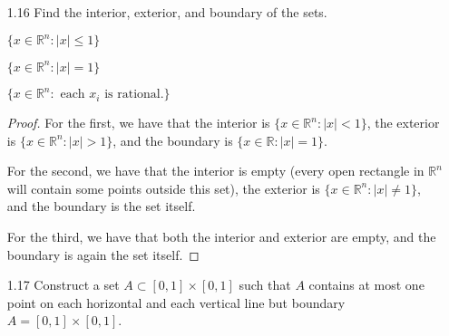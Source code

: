 \begin{enumerate}
    \begin{proof}
    Let \( x \in B_a(r) \). Then, from the Corollary, we get that there exists an open rectangle, \( U \), such that
    \[
    U \subset B_x\left( r-\left| x-a \right|\right) \subset B_a(r)
    \]
    Therefore, \( B_a(r) \) is open.
    \end{proof}
    
    It is not to hard to apply the same idea backwards: every open rectangle contains an open ball. Thus a set, \( A \), is open if and only if for each \( x \in A \) there exists \( B_x(r) \) such that \( B_x(r) \subset A \). This characterization of open sets is often easier to work with than the characterization provided in the book. We will consider this as given for future exercises.
    
    \item[1.16] Find the interior, exterior, and boundary of the sets.
    \begin{center}
    \( \{ x \in \mathbb{R}^n : \left| x \right| \leq 1 \} \)
    
    \( \{ x \in \mathbb{R}^n : \left| x \right| = 1 \} \)
    
    \( \{ x \in \mathbb{R}^n : \text{ each } x_i \text{ is rational.} \} \)
    \end{center}
    
    \begin{proof}
    For the first, we have that the interior is \( \{ x \in \mathbb{R}^n: \left| x \right| < 1 \} \), the exterior is \( \{ x \in \mathbb{R}^n : \left| x \right| > 1 \} \), and the boundary is \( \{ x \in \mathbb{R}: \left| x \right| = 1 \} \).
    
    For the second, we have that the interior is empty (every open rectangle in \( \mathbb{R}^n \) will contain some points outside this set), the exterior is \( \{ x \in \mathbb{R}^n: \left| x \right| \neq 1 \} \), and the boundary is the set itself.
    
    For the third, we have that both the interior and exterior are empty, and the boundary is again the set itself.
    \end{proof}
    
    \item[1.17] Construct a set \( A \subset [0,1] \times [0,1] \) such that \( A \) contains at most one point on each horizontal and each vertical line but boundary \( A = [0,1] \times [0,1] \). 
    

\end{enumerate}
